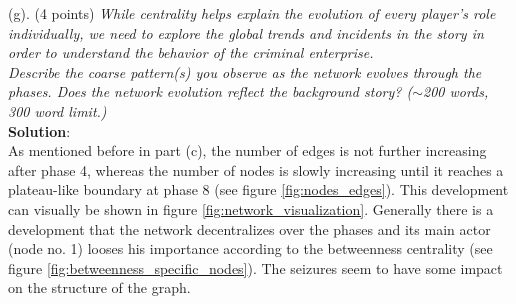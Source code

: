 (g). (4 points) \textsl{While centrality helps explain the evolution of every player's role individually, we need to explore the global trends and incidents in the story in order to understand the behavior of the criminal enterprise.}\\
\textsl{Describe the coarse pattern(s) you observe as the network evolves through the phases. Does the network evolution reflect the background story? ($\sim$200 words, 300 word limit.)}\\

\textbf{Solution}:\\
As mentioned before in part (c), the number of edges is not further increasing after phase 4, whereas the number of nodes is slowly increasing until it reaches a plateau-like boundary at phase 8 (see figure \ref{fig:nodes_edges}). This development can visually be shown in figure \ref{fig:network_visualization}. Generally there is a development that the network decentralizes over the phases and its main actor (node no. 1) looses his importance according to the betweenness centrality (see figure \ref{fig:betweenness_specific_nodes}). The seizures seem to have some impact on the structure of the graph.\\

